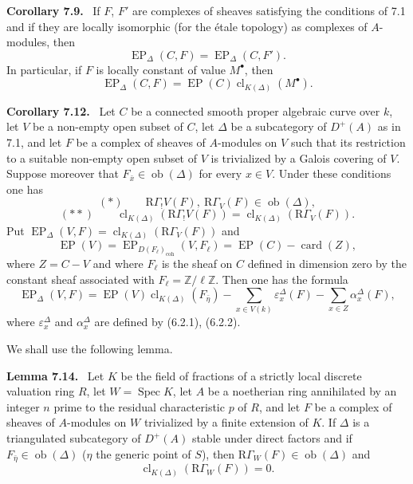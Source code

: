 \documentclass[11pt]{article}
\newenvironment{statement}[1]{\par\medskip\noindent\textbf{#1.}\ }{\par\medskip}
\DeclareMathOperator{\Spec}{Spec}
\providecommand{\EP}{\operatorname{EP}}
\providecommand{\coh}{\mathrm{coh}}
\providecommand{\Ob}{\operatorname{ob}}
\providecommand{\Ob}{\operatorname{ob}}
\providecommand{\Spec}{\operatorname{Spec}}
\providecommand{\EP}{\operatorname{EP}}
\providecommand{\Spec}{\operatorname{Spec}}
\providecommand{\Ob}{\operatorname{Ob}}
\providecommand{\coh}{\mathrm{coh}}
\providecommand{\clK}[1]{\operatorname{cl}_{K(#1)}}
\providecommand{\RG}{\mathrm R\Gamma}
\providecommand{\Spec}{\operatorname{Spec}}
\providecommand{\Ob}{\operatorname{ob}}
\providecommand{\Spec}{\operatorname{Spec}}
\providecommand{\Ob}{\operatorname{Ob}}
\begin{document}
\begin{statement}{Corollary 7.9}
If $F$, $F'$ are complexes of sheaves satisfying the conditions of 7.1 and if they are locally isomorphic (for the étale topology) as complexes of $A$-modules, then
\[
\EP_\Delta(C,F)=\EP_\Delta(C,F').
\tag{7.10}
\]
In particular, if $F$ is locally constant of value $M^\bullet$, then
\[
\EP_\Delta(C,F)=\EP(C)\clK{\Delta}(M^\bullet).
\tag{7.11}
\]
\end{statement}

\begin{statement}{Corollary 7.12}
Let $C$ be a connected smooth proper algebraic curve over $k$, let $V$ be a non-empty open subset of $C$, let $\Delta$ be a subcategory of $D^+(A)$ as in 7.1, and let $F$ be a complex of sheaves of $A$-modules on $V$ such that its restriction to a suitable non-empty open subset of $V$ is trivialized by a Galois covering of $V$. Suppose moreover that $F_{\bar x}\in\Ob(\Delta)$ for every $x\in V$. Under these conditions one has
\[
(*)\qquad \RG_!V(F),\ \RG_V(F)\in\Ob(\Delta),
\]
\[
(**)\qquad
\clK{\Delta}(\RG_!V(F))=\clK{\Delta}(\RG_V(F)).
\]
Put $\EP_\Delta(V,F)=\clK{\Delta}(\RG_V(F))$ and
\[
\EP(V)=\EP_{D(F_\ell)_{\coh}}(V,F_\ell)=\EP(C)-\operatorname{card}(Z),
\]
where $Z=C-V$ and where $F_\ell$ is the sheaf on $C$ defined in dimension zero by the constant sheaf associated with $F_\ell=\mathbb Z/\ell\mathbb Z$. Then one has the formula
\[
\EP_\Delta(V,F)
=
\EP(V)\clK{\Delta}(F_{\bar\eta})
-\sum_{x\in V(k)}\varepsilon_x^\Delta(F)
-\sum_{x\in Z}\alpha_x^\Delta(F),
\tag{7.13}
\]
where $\varepsilon_x^\Delta$ and $\alpha_x^\Delta$ are defined by (6.2.1), (6.2.2).
\end{statement}

We shall use the following lemma.

\begin{statement}{Lemma 7.14}
Let $K$ be the field of fractions of a strictly local discrete valuation ring $R$, let $W=\Spec K$, let $A$ be a noetherian ring annihilated by an integer $n$ prime to the residual characteristic $p$ of $R$, and let $F$ be a complex of sheaves of $A$-modules on $W$ trivialized by a finite extension of $K$. If $\Delta$ is a triangulated subcategory of $D^+(A)$ stable under direct factors and if $F_{\bar\eta}\in\Ob(\Delta)$ ($\eta$ the generic point of $S$), then $\RG_W(F)\in\Ob(\Delta)$ and
\[
\clK{\Delta}(\RG_W(F))=0.
\]
\end{statement}
\end{document}
